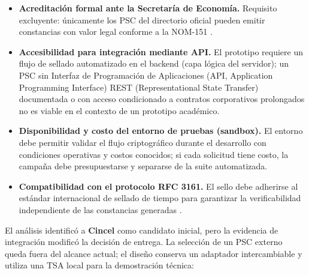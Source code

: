 \begin{itemize}
  \item \textbf{Acreditación formal ante la Secretaría de Economía.} Requisito excluyente: únicamente los PSC del directorio oficial pueden emitir constancias con valor legal conforme a la NOM-151 \cite{economia2026}.

  \item \textbf{Accesibilidad para integración mediante API.} El prototipo requiere un flujo de sellado automatizado en el backend (capa lógica del servidor); un PSC sin Interfaz de Programación de Aplicaciones (API, Application Programming Interface) REST (Representational State Transfer) documentada o con acceso condicionado a contratos corporativos prolongados no es viable en el contexto de un prototipo académico.

  \item \textbf{Disponibilidad y costo del entorno de pruebas (sandbox).} El entorno debe permitir validar el flujo criptográfico durante el desarrollo con condiciones operativas y costos conocidos; si cada solicitud tiene costo, la campaña debe presupuestarse y separarse de la suite automatizada.

  \item \textbf{Compatibilidad con el protocolo RFC 3161.} El sello debe adherirse al estándar internacional de sellado de tiempo para garantizar la verificabilidad independiente de las constancias generadas \cite{adams2001}.
\end{itemize}

El análisis identificó a \textbf{Cincel} como candidato inicial, pero la evidencia de integración modificó la decisión de entrega. La selección de un PSC externo queda fuera del alcance actual; el diseño conserva un adaptador intercambiable y utiliza una TSA local para la demostración técnica:

